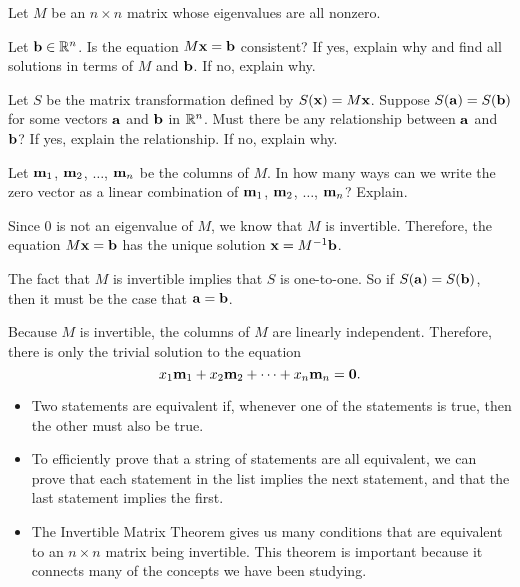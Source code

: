 \begin{example} Let $M$ be an $n \times n$ matrix whose eigenvalues are all nonzero.
\ba
\item Let $\mathbf{b} \in \mathbb{R}^n$. Is the equation $M \mathbf{x} = \mathbf{b}$ consistent? If yes, explain why and find all solutions in terms of $M$ and $\mathbf{b}$. If no, explain why.

\item Let $S$ be the matrix transformation defined by $S(\mathbf{x}) = M\mathbf{x}$. Suppose $S(\mathbf{a}) = S(\mathbf{b})$ for some vectors $\mathbf{a}$ and $\mathbf{b}$ in $\mathbb{R}^n$. Must there be any relationship between $\mathbf{a}$ and $\mathbf{b}$? If yes, explain the relationship. If no, explain why.

\item Let $\mathbf{m}_1$, $\mathbf{m}_2$, $\ldots$, $\mathbf{m}_n$ be the columns of $M$. In how many ways can we write the zero vector as a linear combination of $\mathbf{m}_1$, $\mathbf{m}_2$, $\ldots$, $\mathbf{m}_n$? Explain.

\ea
  


\ExampleSolution
\ba
\item Since $0$ is not an eigenvalue of $M$, we know that $M$ is invertible. Therefore, the equation $M \mathbf{x} = \mathbf{b}$ has the unique solution $\mathbf{x} = M^{-1} \mathbf{b}$.

\item The fact that $M$ is invertible implies that $S$ is one-to-one. So if $S(\mathbf{a}) = S(\mathbf{b})$, then it must be the case that $\mathbf{a} = \mathbf{b}$. 

\item Because $M$ is invertible, the columns of $M$ are linearly independent. Therefore, there is only the trivial solution to the equation 
\[x_1\mathbf{m}_1 + x_2\mathbf{m}_2 +  \cdots + x_n\mathbf{m}_n = \mathbf{0}.\] 

\ea

\end{example}

\begin{itemize}
\item Two statements are equivalent if, whenever one of the statements is true, then the other must also be true. 
\item To efficiently prove that a string of statements are all equivalent, we can prove that each statement in the list implies the next statement, and that the last statement implies the first.  
\item The Invertible Matrix Theorem gives us many conditions that are equivalent to an $n \times n$ matrix being invertible. This theorem is important because it connects many of the concepts we have been studying. 
\end{itemize}


